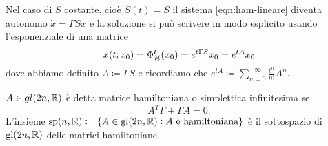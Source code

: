 Nel caso di $ S $ costante, cioè $ S(t) = S $ il sistema \eqref{eqn:ham-lineare} diventa autonomo $ \dot{x} = \Gamma S x $ e la soluzione si può scrivere in modo esplicito usando l'esponenziale di una matrice
\begin{equation}
    x(t; x_0) = \Phi^t_{\mathcal{H}}(x_0) = e^{t \Gamma S} x_0 = e^{tA} x_0
\end{equation}
dove abbiamo definito $ A \coloneqq \Gamma S $ e ricordiamo che $ e^{tA} \coloneqq \sum_{n=0}^{+\infty} \frac{t^n}{n!}A^n $.

\begin{definition}
    $ A \in gl(2n, \mathbb{R}) $ è detta matrice hamiltoniana o simplettica infinitesima se
    \begin{equation}
        A^T \Gamma + \Gamma A = 0.
    \end{equation}
    L'insieme $ \mathrm{sp}(n, \mathbb{R}) \coloneqq \{A \in \mathrm{gl}(2n, \mathbb{R}) : A \text{ è hamiltoniana}\} $ è il sottospazio di $ \mathrm{gl}(2n, \mathbb{R}) $ delle matrici hamiltoniane.
\end{definition}

